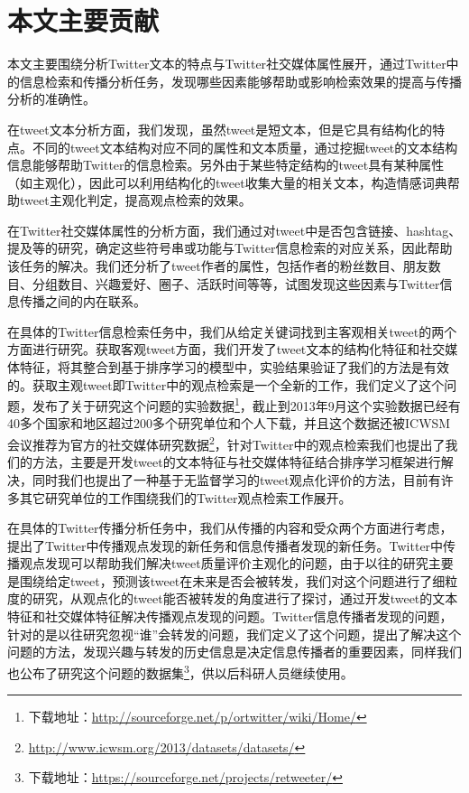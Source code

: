 \section{本文主要贡献}
本文主要围绕分析Twitter文本的特点与Twitter社交媒体属性展开，通过Twitter中的信息检索和传播分析任务，发现哪些因素能够帮助或影响检索效果的提高与传播分析的准确性。

在tweet文本分析方面，我们发现，虽然tweet是短文本，但是它具有结构化的特点。不同的tweet文本结构对应不同的属性和文本质量，通过挖掘tweet的文本结构信息能够帮助Twitter的信息检索。另外由于某些特定结构的tweet具有某种属性（如主观化），因此可以利用结构化的tweet收集大量的相关文本，构造情感词典帮助tweet主观化判定，提高观点检索的效果。

在Twitter社交媒体属性的分析方面，我们通过对tweet中是否包含链接、hashtag、提及等的研究，确定这些符号串或功能与Twitter信息检索的对应关系，因此帮助该任务的解决。我们还分析了tweet作者的属性，包括作者的粉丝数目、朋友数目、分组数目、兴趣爱好、圈子、活跃时间等等，试图发现这些因素与Twitter信息传播之间的内在联系。

在具体的Twitter信息检索任务中，我们从给定关键词找到主客观相关tweet的两个方面进行研究。获取客观tweet方面，我们开发了tweet文本的结构化特征和社交媒体特征，将其整合到基于排序学习的模型中，实验结果验证了我们的方法是有效的。获取主观tweet即Twitter中的观点检索是一个全新的工作，我们定义了这个问题，发布了关于研究这个问题的实验数据\footnote{下载地址：\url{http://sourceforge.net/p/ortwitter/wiki/Home/}}，截止到2013年9月这个实验数据已经有40多个国家和地区超过200多个研究单位和个人下载，并且这个数据还被ICWSM会议推荐为官方的社交媒体研究数据\footnote{\url{http://www.icwsm.org/2013/datasets/datasets/}}，针对Twitter中的观点检索我们也提出了我们的方法，主要是开发tweet的文本特征与社交媒体特征结合排序学习框架进行解决，同时我们也提出了一种基于无监督学习的tweet观点化评价的方法，目前有许多其它研究单位的工作围绕我们的Twitter观点检索工作展开。

在具体的Twitter传播分析任务中，我们从传播的内容和受众两个方面进行考虑，提出了Twitter中传播观点发现的新任务和信息传播者发现的新任务。Twitter中传播观点发现可以帮助我们解决tweet质量评价主观化的问题，由于以往的研究主要是围绕给定tweet，预测该tweet在未来是否会被转发，我们对这个问题进行了细粒度的研究，从观点化的tweet能否被转发的角度进行了探讨，通过开发tweet的文本特征和社交媒体特征解决传播观点发现的问题。Twitter信息传播者发现的问题，针对的是以往研究忽视“谁”会转发的问题，我们定义了这个问题，提出了解决这个问题的方法，发现兴趣与转发的历史信息是决定信息传播者的重要因素，同样我们也公布了研究这个问题的数据集\footnote{下载地址：\url{https://sourceforge.net/projects/retweeter/}}，供以后科研人员继续使用。

